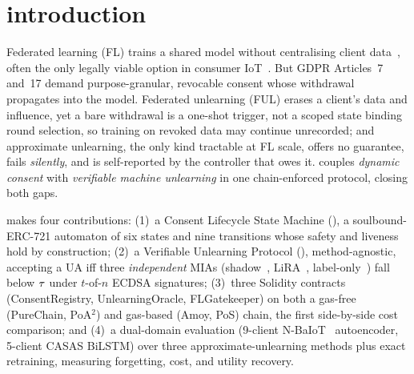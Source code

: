 \vspace{-0.3cm}
\section{introduction}
\label{sec:introduction}

\vspace{-0.2cm}
Federated learning (FL) trains a shared model without centralising
client data~\cite{mcmahan2017fedavg}, often the only legally viable
option in consumer IoT~\cite{isong2026xs}. But GDPR Articles~7 and~17 demand
purpose-granular, revocable consent whose withdrawal propagates into the
model. Federated unlearning (FUL) erases a client's data and influence,
yet a bare withdrawal is a one-shot trigger, not a scoped state binding
round selection, so training on revoked data may continue unrecorded;
and approximate unlearning, the only kind tractable at FL scale, offers
no guarantee, fails \emph{silently}, and is self-reported by the
controller that owes it. \sysname couples \emph{dynamic consent} with
\emph{verifiable machine unlearning} in one chain-enforced protocol,
closing both gaps.

\sysname makes four contributions: (1)~a Consent Lifecycle State Machine
(\clsm), a soulbound-ERC-721 automaton of six states and nine
transitions whose safety and liveness hold by construction; (2)~a Verifiable Unlearning
Protocol (\vup), method-agnostic, accepting a UA iff three
\emph{independent} MIAs (shadow~\cite{shokri2017mia},
LiRA~\cite{carlini2022lira}, label-only~\cite{choquettechoo2021labelonly})
fall below $\tau$ under $t$-of-$n$ ECDSA signatures; (3)~three
Solidity contracts (ConsentRegistry, UnlearningOracle, FLGatekeeper) on
both a gas-free (PureChain, PoA$^2$) and gas-based (Amoy, PoS) chain, the
first side-by-side cost comparison; and (4)~a dual-domain evaluation
(9-client N-BaIoT~\cite{meidan2018nbaiot} autoencoder, 5-client CASAS
BiLSTM) over three approximate-unlearning methods plus exact retraining,
measuring forgetting, cost, and utility recovery.

